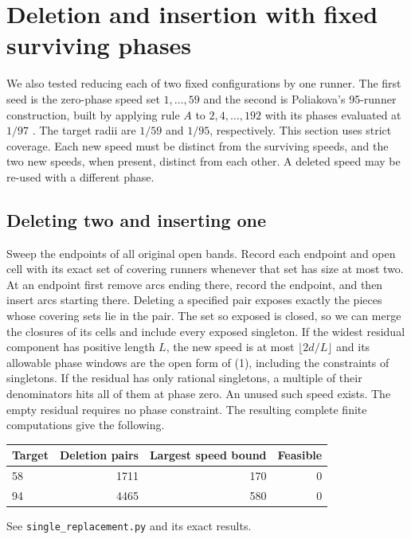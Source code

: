 \documentclass[11pt]{article}
\begin{document}
\section{Deletion and insertion with fixed surviving phases}

We also tested reducing each of two fixed configurations by one
runner. The first seed is the zero-phase speed set \(1,\ldots,59\)
and the second is Poliakova's 95-runner construction, built by
applying rule \(A\) to \(2,4,\ldots,192\) with its phases evaluated
at \(1/97\) \cite[Theorem 7]{Poliakova}. The target radii are
\(1/59\) and \(1/95\), respectively. This section uses strict coverage.
Each new speed must be distinct from the surviving speeds, and the
two new speeds, when present, distinct from each other. A deleted
speed may be re-used with a different phase.

\subsection*{Deleting two and inserting one}

Sweep the endpoints of all original open bands. Record each endpoint
and open cell with its exact set of covering runners whenever that
set has size at most two. At an endpoint first remove arcs ending
there, record the endpoint, and then insert arcs starting there.
Deleting a specified pair exposes exactly the pieces whose covering
sets lie in the pair. The set so exposed is closed, so we can merge
the closures of its cells and include every exposed singleton.
If the widest residual component has positive length \(L\), the new
speed is at most \(\lfloor 2d/L\rfloor\) and its allowable phase
windows are the open form of (1), including the constraints of
singletons. If the residual has only rational singletons, a multiple
of their denominators hits all of them at phase zero. An unused such
speed exists. The empty residual requires no phase constraint.
The resulting complete finite computations give the following.
\begin{center}
\begin{tabular}{@{}lrrr@{}}
\toprule
Target & Deletion pairs & Largest speed bound & Feasible \\
\midrule
58 & 1711 & 170 & 0 \\
94 & 4465 & 580 & 0 \\
\bottomrule
\end{tabular}
\end{center}
See \texttt{single\_replacement.py} and its exact results.
\end{document}
